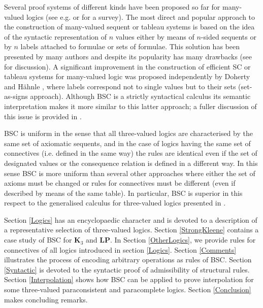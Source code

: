 \documentclass[11pt,a4paper,titlepage]{article}
\theoremstyle{definition}
\newcommand{\3}{\vspace{.3in}}
\newcommand{\2}{\vspace{.2in}}
\newcommand{\1}{\vspace{.1in}}
\newcommand{\5}{\vspace{.05in}}
\begin{document}
Several proof systems of different kinds have been proposed so far for many-valued logics (see e.g. \cite{hah:tab01} or \cite{baaz01} for a survey).
The most direct and popular approach to the construction of many-valued sequent or tableau systems is based on the idea of the syntactic
representation of $n$ values either by means of $n$-sided sequents or by $n$ labels attached to formulae or sets of formulae. This solution has been
presented by many authors and despite its popularity has many drawbacks (see \cite{Indrzejczak2}  for discussion). A significant improvement in the construction of efficient SC or tableau systems for many-valued logic was proposed independently by Doherty \cite{doh:con91} and H\"ahnle \cite{hah:aut94}, where labels
correspond not to single values but to their sets (set-as-signs approach). Although BSC is a strictly syntactical calculus its semantic interpretation makes it more similar to this latter approach; a fuller discussion of this issue is provided in \cite{Indrzejczak3}. 


BSC is uniform in the sense that all three-valued logics are characterised by the same set of axiomatic sequents, and in the case of logics having the same set of connectives (i.e. defined in the same way) the rules are identical even if the set of designated values or the consequence relation is defined in a different way. In this sense BSC is more uniform than several other approaches where either the set of axioms must be changed or rules for connectives must be different (even if described by means of the same table). In particular, BSC is superior in this respect to the generalised calculus for three-valued logics presented in \cite{Indrzejczak2}. 


Section \ref{Logics} has an encyclopaedic character and is devoted to a description of a representative selection of three-valued logics. Section \ref{StrongKleene} contains a case study of BSC for {\bf K$_3$} and {\bf LP}. In Section \ref{OtherLogics}, we provide rules for connectives of all logics introduced in section \ref{Logics}. Section \ref{Comments} illustrates the process of encoding arbitrary operations as rules of BSC. Section \ref{Syntactic} is devoted to the syntactic proof of admissibility of structural rules. Section \ref{Interpolation} shows how BSC can be applied to prove interpolation for some three-valued paraconsistent and paracomplete logics. Section \ref{Conclusion} makes concluding remarks.
\end{document}
